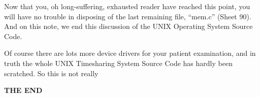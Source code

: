 \newpage
\vfill


Now that you, oh long-suffering,
exhausted reader have reached this
point, you will have no trouble in
disposing of the last remaining file,
``mem.c'' (Sheet 90). And on this note,
we end this discussion of the UNIX
Operating System Source Code.

Of course there are lots more device
drivers for your patient examination,
and in truth the whole UNIX Timesharing System Source Code has hardly
been scratched. So this is not really

\begin{center}
{\bf \large THE END}
\end{center}
